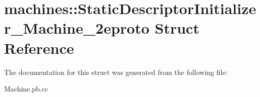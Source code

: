 \hypertarget{structmachines_1_1StaticDescriptorInitializer__Machine__2eproto}{}\section{machines\+:\+:Static\+Descriptor\+Initializer\+\_\+\+Machine\+\_\+2eproto Struct Reference}
\label{structmachines_1_1StaticDescriptorInitializer__Machine__2eproto}


The documentation for this struct was generated from the following file\+:\begin{DoxyCompactItemize}
\item 
Machine.\+pb.\+cc\end{DoxyCompactItemize}
